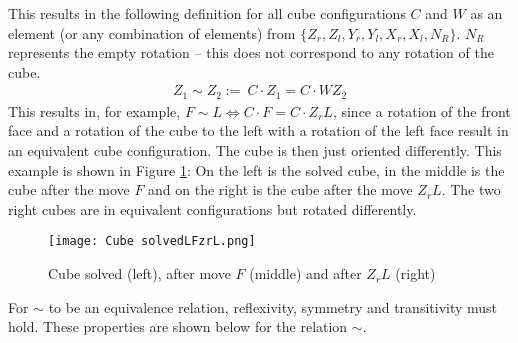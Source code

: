 This results in the following definition for all cube configurations $C$ and $W$ as an element (or any combination of elements) from $\{{Z_r}, {Z_l}, {Y_r}, {Y_l}, {X_r}, {X_l }, N_R\}$. $N_R$ represents the empty rotation -- this does not correspond to any rotation of the cube.
\begin{align*}
Z_1 \sim Z_2 := \ C \cdot Z_1 = C \cdot WZ_2
\end{align*}
This results in, for example, $F \sim L \Leftrightarrow C \cdot F = C \cdot Z_rL$, since a rotation of the front face and a rotation of the cube to the left with a rotation of the left face result in an equivalent cube configuration. The cube is then just oriented differently.
This example is shown in Figure \ref{Figure_Cube solved $L$ (left), after move $F$ (middle) and after $Z_rL$ (right)L}: On the left is the solved cube, in the middle is the cube after the move $F$ and on the right is the cube after the move $Z_rL$. The two right cubes are in equivalent configurations but rotated differently.
\begin{figure}[h]
\centering
\texttt{[image: Cube solvedLFzrL.png]}
\caption[Cube solved, after move $F$ and after $Z_rL$]{Cube solved (left), after move $F$ (middle) and after $Z_rL$ (right)}
\label{Figure_Cube solved $L$ (left), after move $F$ (middle) and after $Z_rL$ (right)L}
\end{figure}

For $\sim$ to be an equivalence relation, reflexivity, symmetry and transitivity must hold. These properties are shown below for the relation $\sim$.


